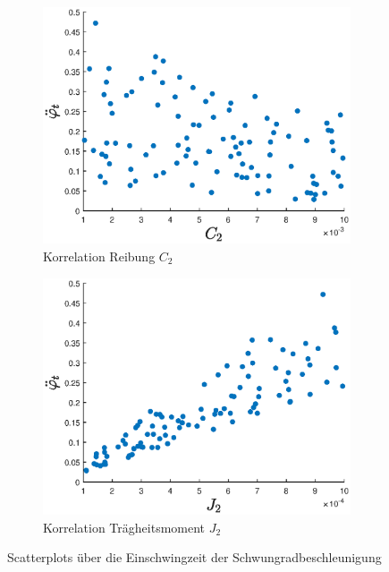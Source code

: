 \begin{figure}
    \centering
    \begin{subfigure}[]{0.45\textwidth}
        \centering
        \includegraphics[width=\textwidth]{Bilder/5_sensi/cm/dotdot_phi_t_c2.eps}
        \caption{Korrelation Reibung $C_2$}
        \label{fig:scatter_dotdotphi_t_c2}
    \end{subfigure}
   \begin{subfigure}[]{0.45\textwidth}
        \centering
        \includegraphics[width=\textwidth]{Bilder/5_sensi/cm/dotdot_phi_t_j2.eps}
        \caption{Korrelation Trägheitsmoment $J_2$}
        \label{fig:scatter_dodottphi_t_j2}
    \end{subfigure}
    \caption{Scatterplots über die Einschwingzeit der Schwungradbeschleunigung}
\end{figure}
